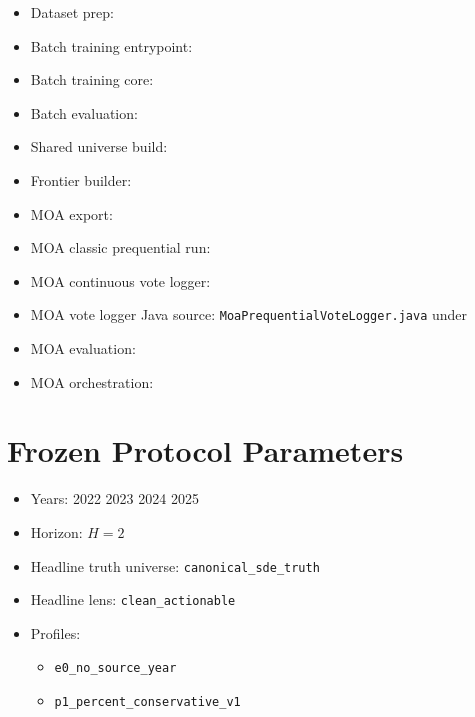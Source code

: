 \begin{itemize}
    \item Dataset prep: 
    \item Batch training entrypoint: 
    \item Batch training core: 
    \item Batch evaluation: 
    \item Shared universe build: 
    \item Frontier builder: 
    \item MOA export: 
    \item MOA classic prequential run: 
    \item MOA continuous vote logger: 
    \item MOA vote logger Java source:
    \texttt{MoaPrequentialVoteLogger.java} under 
    \item MOA evaluation: 
    \item MOA orchestration: 
\end{itemize}

\section{Frozen Protocol Parameters}

\begin{itemize}
    \item Years: 2022 2023 2024 2025
    \item Horizon: $H=2$
    \item Headline truth universe: \texttt{canonical\_sde\_truth}
    \item Headline lens: \texttt{clean\_actionable}
    \item Profiles:
    \begin{itemize}
        \item \texttt{e0\_no\_source\_year}
        \item \texttt{p1\_percent\_conservative\_v1}
    \end{itemize}
\end{itemize}

